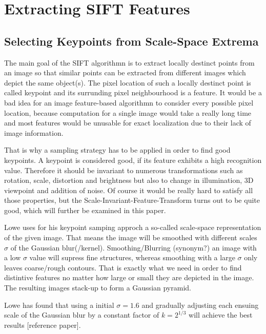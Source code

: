 \documentclass{article}
\begin{document}
	
		
	\title{} \author{Leopold Gaube}
	\date{15.01.2017} \maketitle

\section{Extracting SIFT Features}		
\subsection{Selecting Keypoints from Scale-Space Extrema}

The main goal of the SIFT algorithmn is to extract locally destinct points from an image so that similar points can be extracted from different images which depict the same object(s). 
The pixel location of such a locally destinct point is called keypoint and its surrunding pixel neighbourhood is a feature. It would be a bad idea for an image feature-based algorithmn to consider every possible pixel location, because computation for a single image would take a really long time and most features would be unusable for exact localization due to their lack of image information. 

That is why a sampling strategy has to be applied in order to find good keypoints. A keypoint is considered good, if its feature exhibits a high recognition value. Therefore it should be invariant to numerous transformations such as rotation, scale, distortion and brightness but also to change in illumination, 3D viewpoint and addition of noise. Of course it would be really hard to satisfy all those properties, but the Scale-Invariant-Feature-Transform turns out to be quite good, which will further be examined in this paper.

Lowe uses for his keypoint samping approch a so-called scale-space representation of the given image. That means the image will be smoothed with different scales $\sigma$ of the Gaussian blur(/kernel). Smoothing/Blurring (synonym?) an image with a low $\sigma$ value will supress fine structures, whereas smoothing with a large $\sigma$ only leaves coarse/rough contours. That is exactly what we need in order to find distintive features no matter how large or small they are depicted in the image. The resulting images stack-up to form a Gaussian pyramid.

Lowe has found that using a initial $\sigma = 1.6$ and gradually adjusting each ensuing scale of the Gaussian blur by a constant factor of $k = 2^{1/3}$ will achieve the best results [reference paper].
\end{document}
